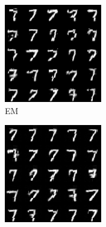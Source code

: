 \begin{figure}[H]
    \centering
    \begin{subfigure}[b]{0.3\textwidth}
        \centering
        \includegraphics[width=\textwidth]{figures/mnist_EM.png} %
        \caption{EM}
        \label{fig:sub1}
    \end{subfigure}
    \hfill
    \begin{subfigure}[b]{0.3\textwidth}
        \centering
        \includegraphics[width=\textwidth]{figures/mnist_SGD.png} %

\end{subfigure}
\end{figure}
